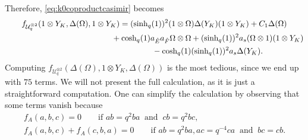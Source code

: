 \documentclass[pdftex]{sigma}
\numberwithin{equation}{section}
\newcommand{\chq}{\mathrm{cosh}_q}
\newcommand{\shq}{\mathrm{sinh}_q}
\newcommand{\tensor}[1]{^{\otimes{#1}}}
\newcommand{\Uq}{\mathcal{U}_q}
\begin{document}
Therefore, \eqref{eq:k0coproductcasimir} becomes
\begin{gather*} f_{\Uq\tensor{2}}(1\otimes Y_K,\Delta(\Omega),1\otimes Y_K)=(\shq(1))^2(1\otimes \Omega)\Delta(Y_K)(1\otimes Y_K) + C_1\Delta(\Omega) \\
\hphantom{f_{\Uq\tensor{2}}(1\otimes Y_K,\Delta(\Omega),1\otimes Y_K)=}{}
		+ \chq(1)a_{\hat{E}}a_{\hat{F}} \Omega\otimes\Omega + (\shq(1))^2a_s(\Omega\otimes 1)(1\otimes Y_K) \\
\hphantom{f_{\Uq\tensor{2}}(1\otimes Y_K,\Delta(\Omega),1\otimes Y_K)=}{}
		- \chq(1)(\shq(1))^2a_s \Delta(Y_K).
	\end{gather*}
Computing $f_{\Uq\tensor{2}}(\Delta(\Omega),1\otimes Y_K,\Delta(\Omega))$ is the most tedious, since we end up with $75$ terms. We will not present the full calculation, as it is just a straightforward computation. One can simplify the calculation by observing that some terms vanish because
\begin{gather*}
	f_A(a,b,c)=0\qquad \text{if }ab=q^2ba \ \text{ and }\ cb=q^2bc,\\
	f_A(a,b,c)+f_A(c,b,a)=0\qquad \text{if }ab=q^2ba, ac=q^{-4}ca \ \text{ and }\ bc=cb.
\end{gather*}
\end{document}
